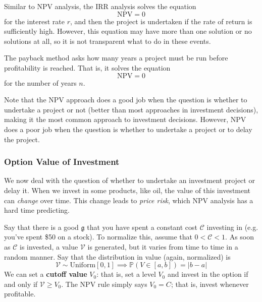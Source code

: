 \documentclass{article}
\begin{document}
      \begin{definition}
        \label{def:internal-rate-of-return-analysis}
        Similar to NPV analysis, the IRR analysis solves the equation
        \begin{equation}
          \text{NPV} = 0
        \end{equation}
        for the interest rate $r$, and then the project is undertaken if the rate of return is sufficiently high. However, this equation may have more than one solution or no solutions at all, so it is not transparent what to do in these events. 
      \end{definition}

      \begin{definition}
        \label{def:payback-method}
        The payback method asks how many years a project must be run before profitability is reached. That is, it solves the equation
        \begin{equation}
          \text{NPV} = 0
        \end{equation}
        for the number of years $n$. 
      \end{definition}

      Note that the NPV approach does a good job when the question is whether to undertake a project or not (better than most approaches in investment decisions), making it the most common approach to investment decisions. However, NPV does a poor job when the question is whether to undertake a project or to delay the project. 

    \subsubsection{Option Value of Investment}

      We now deal with the question of whether to undertake an investment project or delay it. When we invest in some products, like oil, the value of this investment can \textit{change} over time. This change leads to \textit{price risk}, which NPV analysis has a hard time predicting. 

      Say that there is a good $\mathfrak{g}$ that you have spent a constant cost $\mathcal{C}$ investing in (e.g. you've spent \$50 on a stock). To normalize this, assume that $0 < \mathcal{C} < 1$. As soon as $\mathcal{C}$ is invested, a value $\mathcal{V}$ is generated, but it varies from time to time in a random manner. Say that the distribution in value (again, normalized) is
      \begin{equation}
        \mathcal{V} \sim \text{Uniform}[0,1] \implies \mathbb{P}(V \in [a,b]) = |b-a|
      \end{equation}
      We can set a \textbf{cutoff value} $V_0$: that is, set a level $V_0$ and invest in the option if and only if $\mathcal{V} \geq V_0$. The NPV rule simply says $V_0 = C$; that is, invest whenever profitable. 
\end{document}
